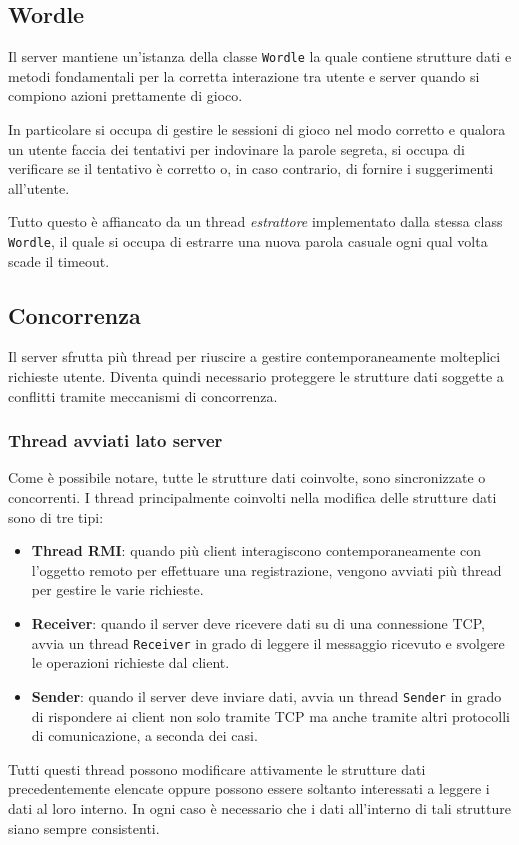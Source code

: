 \subsection{Wordle}
Il server mantiene un'istanza della classe \verb|Wordle| la quale contiene strutture dati e metodi
fondamentali per la corretta interazione tra utente e server quando si compiono azioni prettamente
di gioco.

In particolare si occupa di gestire le sessioni di gioco nel modo corretto e qualora un utente
faccia dei tentativi per indovinare la parole segreta, si occupa di verificare se il tentativo è
corretto o, in caso contrario, di fornire i suggerimenti all'utente.

Tutto questo è affiancato da un thread \emph{estrattore} implementato dalla stessa class
\verb|Wordle|, il quale si occupa di estrarre una nuova parola casuale ogni qual volta scade il
timeout.

\subsection{Concorrenza}
Il server sfrutta più thread per riuscire a gestire contemporaneamente molteplici richieste utente.
Diventa quindi necessario proteggere le strutture dati soggette a conflitti tramite meccanismi di
concorrenza.

\subsubsection{Thread avviati lato server}
Come è possibile notare, tutte le strutture dati coinvolte, sono sincronizzate o concorrenti. I
thread principalmente coinvolti nella modifica delle strutture dati sono di tre tipi:
\begin{itemize}
	\item \textbf{Thread RMI}: quando più client interagiscono contemporaneamente con l'oggetto
	      remoto per effettuare una registrazione, vengono avviati più thread per gestire le varie
	      richieste.
	\item \textbf{Receiver}: quando il server deve ricevere dati su di una connessione TCP,
	      avvia un thread \verb|Receiver| in grado di leggere il messaggio ricevuto e svolgere le
	      operazioni richieste dal client.
	\item \textbf{Sender}: quando il server deve inviare dati, avvia un thread \verb|Sender| in
	      grado di rispondere ai client non solo tramite TCP ma anche tramite altri protocolli di
	      comunicazione, a seconda dei casi.
\end{itemize}
Tutti questi thread possono modificare attivamente le strutture dati precedentemente elencate
oppure possono essere soltanto interessati a leggere i dati al loro interno. In ogni caso è
necessario che i dati all'interno di tali strutture siano sempre consistenti.


